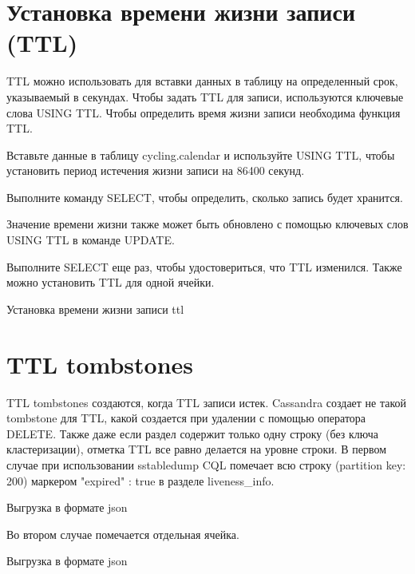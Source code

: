 \section{Установка времени жизни записи (TTL)}

TTL можно использовать для вставки данных в таблицу на определенный
срок, указываемый в секундах.
Чтобы задать TTL для записи, используются
ключевые слова USING TTL. Чтобы определить время жизни записи
необходима функция TTL.\par
Вставьте данные в таблицу cycling.calendar и используйте USING
TTL, чтобы установить период истечения жизни записи на 86400 секунд.\par
Выполните команду SELECT, чтобы определить, сколько запись будет
хранится.\par
Значение времени жизни также может быть обновлено с помощью
ключевых слов USING TTL в команде UPDATE.\par
Выполните SELECT еще раз, чтобы удостовериться, что TTL изменился.
Также можно установить TTL для одной ячейки.

\begin{image}
	\caption{Установка времени жизни записи ttl}
	\label{fig:ttl}
\end{image}

\section{TTL tombstones}

TTL tombstones создаются, когда TTL записи истек. Cassandra создает не
такой tombstone для TTL, какой создается при удалении с помощью оператора
DELETE. Также даже если раздел содержит только одну строку (без ключа
кластеризации), отметка TTL все равно делается на уровне строки.
В первом случае при использовании sstabledump CQL помечает всю
строку (partition key: 200) маркером "expired" : true в разделе liveness\_info.

\begin{image}
	\caption{Выгрузка в формате json}
	\label{fig:tombstones:cycling}
\end{image}

Во втором случае помечается отдельная ячейка.

\begin{image}
	\caption{Выгрузка в формате json}
	\label{fig:tombstone:rank-by-year-and-name}
\end{image}

